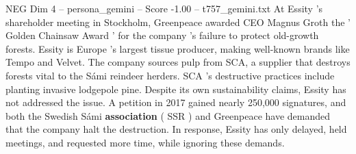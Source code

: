 \begin{textsample}{NEG Dim 4 – persona\_gemini – Score -1.00 – t757\_gemini.txt}  \label{ex:f4_neg_003}
At Essity 's shareholder meeting in Stockholm, Greenpeace awarded CEO Magnus Groth the ' Golden Chainsaw Award ' for the company 's failure to protect old-growth forests.
Essity is Europe 's largest tissue producer, making well-known brands like Tempo and Velvet.
The company sources pulp from SCA, a supplier that destroys forests vital to the Sámi reindeer herders.
SCA 's destructive practices include planting invasive lodgepole pine.
Despite its own sustainability claims, Essity has not addressed the issue.
A petition in 2017 gained nearly 250,000 signatures, and both the Swedish Sámi \textbf{association} ( SSR ) and Greenpeace have demanded that the company halt the destruction.
In response, Essity has only delayed, held meetings, and requested more time, while ignoring these demands.

\end{textsample}

